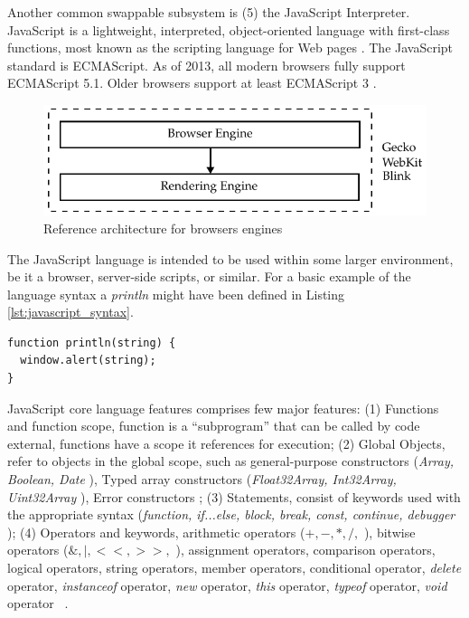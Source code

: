 Another common swappable subsystem is (5) the JavaScript Interpreter. JavaScript is a lightweight, interpreted, object-oriented language with first-class functions, most known as the scripting language for Web pages \cite{Gecko2013}. The JavaScript standard is ECMAScript. As of 2013, all modern browsers fully support ECMAScript 5.1. Older browsers support at least ECMAScript 3 \cite{Gecko2013} \cite{International2009}.

\begin{figure}[!htb]
  \centering
  \includegraphics{chapters/basic_concepts/web_architecture_engines.pdf}
  \caption{Reference architecture for browsers engines}
  \label{figure:web_architecture_engines}
\end{figure}

The JavaScript language is intended to be used within some larger environment, be it a browser, server-side scripts, or similar. For a basic example of the language syntax a \textit{println} might have been defined in Listing \ref{lst:javascript_syntax}.

\begin{lstlisting}[label={lst:javascript_syntax},caption=Basic example of JavaScript syntax]
function println(string) {
  window.alert(string);
}
\end{lstlisting}

JavaScript core language features comprises few major features: (1) Functions and function scope, function is a ``subprogram'' that can be called by code external, functions have a scope it references for execution; (2) Global Objects, refer to objects in the global scope, such as general-purpose constructors (\textit{Array, Boolean, Date} \etc), Typed array constructors (\textit{Float32Array, Int32Array, Uint32Array} \etc), Error constructors \etc; (3) Statements, consist of keywords used with the appropriate syntax (\textit{function, if...else, block, break, const, continue, debugger \etc}); (4) Operators and keywords, arithmetic operators ($+, -, *, /,$ \etc), bitwise operators ($\&, |, <<, >>,$ \etc), assignment operators, comparison operators, logical operators, string operators, member operators, conditional operator, \textit{delete} operator, \textit{instanceof} operator, \textit{new} operator, \textit{this} operator, \textit{typeof} operator, \textit{void} operator \etc\ \cite{MDN2013}.

